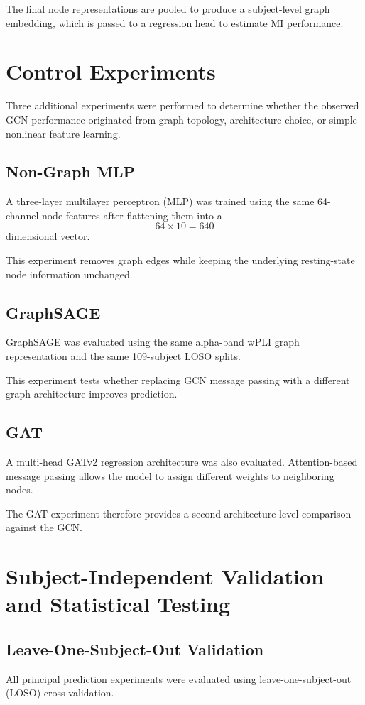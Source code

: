 \documentclass[conference]{IEEEtran}
\begin{document}
The final node representations are pooled to produce a subject-level graph embedding, which is passed to a regression head to estimate MI performance.

\section{Control Experiments}
Three additional experiments were performed to determine whether the observed GCN performance originated from graph topology, architecture choice, or simple nonlinear feature learning.

\subsection{Non-Graph MLP}
A three-layer multilayer perceptron (MLP) was trained using the same 64-channel node features after flattening them into a
\begin{equation}
64 \times 10 = 640
\end{equation}
dimensional vector.

This experiment removes graph edges while keeping the underlying resting-state node information unchanged.

\subsection{GraphSAGE}
GraphSAGE was evaluated using the same alpha-band wPLI graph representation and the same 109-subject LOSO splits.

This experiment tests whether replacing GCN message passing with a different graph architecture improves prediction.

\subsection{GAT}
A multi-head GATv2 regression architecture was also evaluated. Attention-based message passing allows the model to assign different weights to neighboring nodes.

The GAT experiment therefore provides a second architecture-level comparison against the GCN.

\section{Subject-Independent Validation and Statistical Testing}
\subsection{Leave-One-Subject-Out Validation}
All principal prediction experiments were evaluated using leave-one-subject-out (LOSO) cross-validation.
\end{document}
